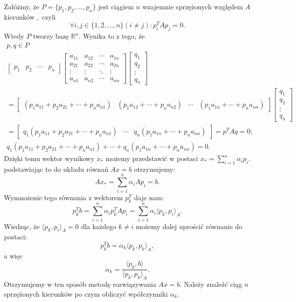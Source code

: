 \documentclass[a4paper,12pt]{book} %
\begin{document}
Załóżmy, że $P = \{p_1, p_2, \ldots, p_n\}$ jest ciągiem $n$ wzajemnie sprzężonych względem $A$ kierunków $,$ czyli 
$$\forall i, j \in \{ 1, 2, \ldots, n\} (i\neq j): p_i^TAp_j = 0 .$$
Wtedy $P$ tworzy bazę $\mathbb{R}^n$. Wynika to z tego, że
\begin{gather*}
p, q \in P \\
\begin{bmatrix}
p_1 & p_2 & \cdots & p_n
\end{bmatrix}
\begin{bmatrix}
a_{11} & a_{12} & \cdots & a_{1n} \\
a_{21} & a_{22} & \cdots & a_{2n} \\
\vdots & \vdots & \ddots & \vdots \\
a_{n1} & a_{n2} & \cdots & a_{nn}
\end{bmatrix}
\begin{bmatrix}
q_1 \\
q_2 \\
\vdots \\
q_n
\end{bmatrix}
\\
=
\begin{bmatrix}
(p_1a_{11} + p_2a_{21} + \cdots + p_na_{n1}) & (p_1a_{12} + \cdots + p_na_{n2}) & \cdots & (p_1a_{1n} + \cdots + p_na_{nn})
\end{bmatrix}
\begin{bmatrix}
q_1 \\
q_2 \\
\vdots \\
q_n
\end{bmatrix}
\\
= 
\begin{bmatrix}
q_1(p_1a_{11} + p_2a_{21} + \cdots + p_na_{n1}) & \cdots & q_n(p_1a_{1n} + \cdots + p_na_{nn})
\end{bmatrix}
= p^TAq = 0;
\\
q_1(p_1a_{11} + p_2a_{21} + \cdots + p_na_{n1}) + \cdots + q_n(p_1a_{1n} + \cdots + p_na_{nn}) = 0.
\end{gather*}
Dzięki temu wektor wynikowy $x_*$ możemy przedstawić w postaci $x_* = \sum_{i=1}^n\alpha_ip_i.$ podstawiając to do układu równań $Ax = b$ otrzymujemy:
$$ Ax_* = \sum^n_{i=1}\alpha_iAp_i = b. $$ Wymnożenie tego równania z wektorem $p_k^T$ daje nam:
$$p_k^Tb = \sum_{i=1}^n\alpha_ip_k^TAp_i = \sum_{i=1}^n\alpha_i\langle p_k, p_i\rangle_A.$$
Wiedząc, że $\langle p_k, p_i \rangle_A = 0$ dla każdego $k \neq i$ możemy dalej uprościć równanie do postaci:
$$p_k^Tb = \alpha_k\langle p_k, p_k\rangle_A,$$ 
a więc
$$ \alpha_k = \frac{\langle p_k, b \rangle }{\langle p_k, p_k \rangle_A}. $$
Otrzymujemy w ten sposób metodę rozwiązywania $Ax = b.$ Należy znaleźć ciąg $n$ sprzężonych kierunków po czym obliczyć wpółczynniki $\alpha_k.$
\end{document}
